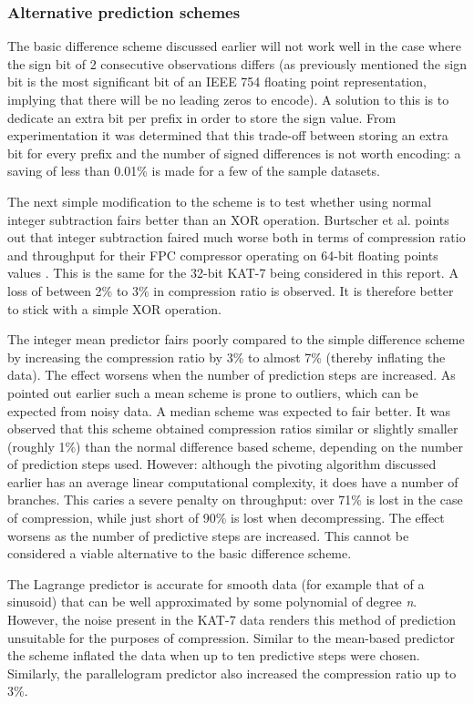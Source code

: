   \subsubsection{Alternative prediction schemes}
  The basic difference scheme discussed earlier will not work well in the case where the sign bit of 2 consecutive observations differs (as previously mentioned the sign bit is the most significant bit of an IEEE 754 
  floating point representation, implying that there will be no leading zeros to encode). A solution to this is to dedicate an extra bit per prefix in order to store the sign value. From experimentation it was determined that
  this trade-off between storing an extra bit for every prefix and the number of signed differences is not worth encoding: a saving of less than 0.01\% is made for a few of the sample datasets. 
  
  The next simple modification to the scheme is to test whether using normal integer subtraction fairs better than an XOR operation. Burtscher et al. points out that integer subtraction faired much worse both in terms of
  compression ratio and throughput for their FPC compressor operating on 64-bit floating points values \cite{4589203}. This is the same for the 32-bit KAT-7 being considered in this report. A loss of between 2\% to 3\% in 
  compression ratio is observed. It is therefore better to stick with a simple XOR operation.
  
  The integer mean predictor fairs poorly compared to the simple difference scheme by increasing the compression ratio by 3\% to almost 7\% (thereby inflating the data). The effect worsens when the number of prediction 
  steps are increased. As pointed out earlier such a mean scheme is prone to outliers, which can be expected from noisy data. A median scheme was expected to fair better. It was observed that this scheme obtained compression ratios
  similar or slightly smaller (roughly 1\%) than the normal difference based scheme, depending on the number of prediction steps used. However: although the pivoting algorithm discussed earlier has an average linear computational 
  complexity, it does have a number of branches. This caries a severe penalty on throughput: over 71\% is lost in the case of compression, while just short of 90\% is lost when decompressing. The effect worsens as the number of
  predictive steps are increased. This cannot be considered a viable alternative to the basic difference scheme.
  
  The Lagrange predictor is accurate for smooth data (for example that of a sinusoid) that can be well approximated by some polynomial of degree \textit{n}. However, the noise present in the KAT-7 data renders this
  method of prediction unsuitable for the purposes of compression. Similar to the mean-based predictor the scheme inflated the data when up to ten predictive steps were chosen. Similarly, the parallelogram predictor 
  also increased the compression ratio up to 3\%.
  
